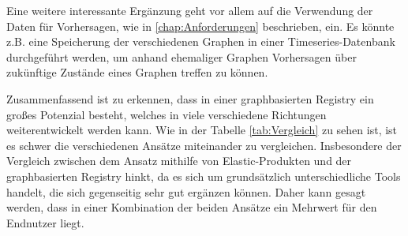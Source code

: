 \documentclass[
	12pt,
	BCOR=5mm,
	DIV=12,
	headinclude=on,
	footinclude=off,
	parskip=half,
	bibliography=totoc,
	listof=entryprefix,
	toc=listof,
	numbers=noenddot,
	plainfootsepline
]{scrreprt}
\begin{document}
Eine weitere interessante Ergänzung geht vor allem auf die Verwendung der Daten für Vorhersagen, wie in \vref{chap:Anforderungen} beschrieben, ein. Es könnte z.B. eine Speicherung der verschiedenen Graphen in einer Timeseries-Datenbank durchgeführt werden, um anhand ehemaliger Graphen Vorhersagen über zukünftige Zustände eines Graphen treffen zu können.

Zusammenfassend ist zu erkennen, dass in einer graphbasierten Registry ein großes Potenzial besteht, welches in viele verschiedene Richtungen weiterentwickelt werden kann. Wie in der Tabelle \vref{tab:Vergleich} zu sehen ist, ist es schwer die verschiedenen Ansätze miteinander zu vergleichen. Insbesondere der Vergleich zwischen dem Ansatz mithilfe von Elastic-Produkten und der graphbasierten Registry hinkt, da es sich um grundsätzlich unterschiedliche Tools handelt, die sich gegenseitig sehr gut ergänzen können. Daher kann gesagt werden, dass in einer Kombination der beiden Ansätze ein Mehrwert für den Endnutzer liegt.
\clearpage
\ihead{}
\printbibliography[title=Literaturverzeichnis]
\cleardoublepage

\end{document}
